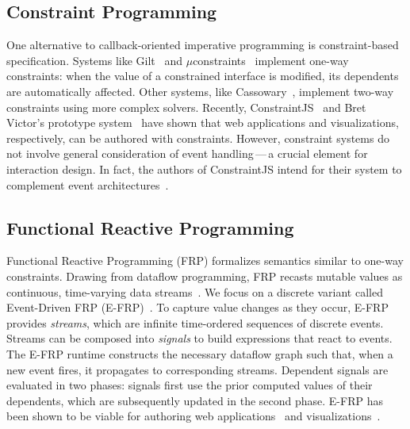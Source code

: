 \vspace{-20pt}

\subsection{Constraint Programming}

\vspace{-7pt}

One alternative to callback-oriented imperative programming is constraint-based
specification. Systems like Gilt~\cite{myers:callbacks} and
$\mu$constraints~\cite{hudson:constraints} implement one-way constraints: when
the value of a constrained interface is modified, its dependents are
automatically affected. Other systems, like Cassowary~\cite{badros:cassowary},
implement two-way constraints using more complex solvers. Recently,
ConstraintJS~\cite{oney:constraintjs} and Bret Victor's prototype
system~\cite{victor:drawing} have shown that web applications and
visualizations, respectively, can be authored with constraints. However,
constraint systems do not involve general consideration of event
handling\,---\,a crucial element for interaction design. In fact, the authors of
ConstraintJS intend for their system to complement event
architectures~\cite{oney:constraintjs}.

\vspace{-20pt}

\subsection{Functional Reactive Programming}

\vspace{-7pt}

Functional Reactive Programming (FRP) formalizes semantics similar to one-way
constraints. Drawing from dataflow programming, FRP recasts mutable values as
continuous, time-varying data streams~\cite{bainomugisha:frpsurvey}. We focus on
a discrete variant called Event-Driven FRP (E-FRP)~\cite{wan:efrp}. To capture
value changes as they occur, E-FRP provides \emph{streams}, which are infinite
time-ordered sequences of discrete events. Streams can be composed into
\emph{signals} to build expressions that react to events. The E-FRP runtime
constructs the necessary dataflow graph such that, when a new event fires, it
propagates to corresponding streams. Dependent signals are evaluated in two
phases: signals first use the prior computed values of their dependents, which
are subsequently updated in the second phase. E-FRP has been shown to be viable
for authoring web applications~\cite{czaplicki:elm, meyerovich:flapjax} and
visualizations~\cite{cottam:stencil, kelleher:modeljs}.

